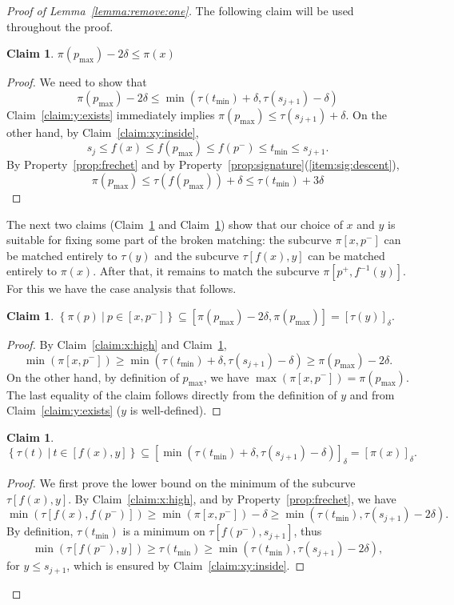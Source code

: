 \documentclass[11pt, letter]{article}
\newtheorem{claim}[theorem]{Claim}
\newcommand{\lemref}[1]{Lemma~\ref{lemma:#1}}
\newcommand{\claimlab}[1]{\label{claim:#1}}
\newcommand{\claimref}[1]{Claim~\ref{claim:#1}}
\newcommand{\propref}[1]{Property~\ref{prop:#1}}
\providecommand{\pth}[2][\!]{#1\left({#2}\right)}
\providecommand{\brc}[1]{\left\{ {#1} \right\}}
\newcommand{\setSubC}[4]{\ensuremath{\brc{ #1(#2) ~|~ #2 \in [#3,#4]} }}
\newcommand{\range}[2]{\ensuremath{[#1]_{#2}}}
\newcommand{\minSubC}[4]{\ensuremath{\min( #1[#3,#4])}}
\newcommand{\maxSubC}[4]{\ensuremath{\max( #1[#3,#4])}}
\begin{document}
\begin{proof}[Proof of \lemref{remove:one}]
The following claim will be used throughout the proof.
\begin{claim} 
$\pi(p_{\max}) - 2\delta \leq \pi(x)$
\claimlab{not:so:bad}
\claimlab{max:dist}
\end{claim}

\begin{proof}
We need to show that 
\[ \pi(p_{\max}) - 2 \delta \leq \min(\tau(t_{\min}) + \delta, \tau(s_{j+1})-\delta)\]
\claimref{y:exists} immediately implies $\pi(p_{\max}) \leq \tau(s_{j+1}) + \delta$.
On the other hand, by \claimref{xy:inside}, 
\[s_j \leq f(x) \leq f(p_{\max}) \leq f(p^{-}) \leq t_{\min} \leq s_{j+1}.\]
By \propref{frechet} and by \propref{signature}(\ref{item:sig:descent}),
\[\pi(p_{\max}) \leq \tau(f(p_{\max})) + \delta \leq \tau(t_{\min}) + 3\delta \]
\end{proof}




The next two claims (\claimref{frechet:y} and
\claimref{frechet:x}) show that our choice of $x$ and $y$ is suitable for fixing some part
of the broken matching: the subcurve $\pi[x,p^{-}]$ can be matched
entirely to $\tau(y)$ and the subcurve $\tau[f(x),y]$ can be matched entirely to
$\pi(x)$. After that, it remains to match the subcurve $\pi[p^{+}, f^{-1}(y)]$. For
this we have the case analysis that follows.


\begin{claim}
$\setSubC{\pi}{p}{x}{p^{-}} \subseteq  [\pi(p_{\max}) -2\delta, \pi(p_{\max})] = \range{\tau(y)}{\delta}.$
\claimlab{frechet:y}
\claimlab{frechet:ya}
\end{claim}
\begin{proof}
By \claimref{x:high} and \claimref{not:so:bad},
\[\minSubC{\pi}{p}{x}{p^{-}} \geq \min\pth{\tau(t_{\min})+\delta, \tau(s_{j+1})-\delta} \geq \pi(p_{\max})-2\delta.\]
On the other hand, by definition of $p_{\max}$, we have
$\maxSubC{\pi}{p}{x}{p^{-}} = \pi(p_{\max}).$
The last equality of the claim follows directly from the definition of $y$ and from \claimref{y:exists} ($y$ is well-defined).
\end{proof}

\begin{claim}
$\setSubC{\tau}{t}{f(x)}{y} \subseteq 
\range{\min\pth{\tau(t_{\min}) + \delta, \tau(s_{j+1})-\delta}}{\delta}
= \range{\pi(x)}{\delta}.$
\claimlab{frechet:x}
\end{claim}
\begin{proof}
We first prove the lower bound on the minimum of the subcurve $\tau[f(x),y]$.
By \claimref{x:high}, and by \propref{frechet}, we have
\[\minSubC{\tau}{t}{f(x)}{f(p^{-})} \geq \minSubC{\pi}{p}{x}{p^{-}} - \delta \geq \min\pth{\tau(t_{\min}), \tau(s_{j+1})-2\delta}.\] 
By definition, $\tau(t_{\min})$ is a minimum on $\tau[f(p^{-}), s_{j+1}]$, thus
\[\minSubC{\tau}{t}{f(p^{-})}{y} \geq \tau(t_{\min}) \geq
\min\pth{\tau(t_{\min}), \tau(s_{j+1})-2\delta},\]
for $y \leq s_{j+1}$, which is ensured by \claimref{xy:inside}. 


\end{proof}
\end{proof}
\end{document}
